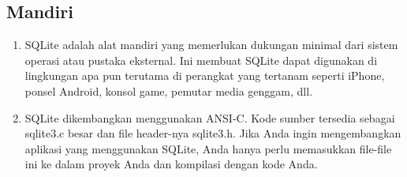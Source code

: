 \begin{enumerate}
		\subsection{Mandiri}
		\begin{enumerate}
		\item SQLite adalah alat mandiri yang memerlukan dukungan minimal dari sistem operasi atau pustaka eksternal. Ini membuat SQLite dapat digunakan di lingkungan apa pun terutama di perangkat yang tertanam seperti iPhone, ponsel Android, konsol game, pemutar media genggam, dll.
		\item SQLite dikembangkan menggunakan ANSI-C. Kode sumber tersedia sebagai sqlite3.c besar dan file header-nya sqlite3.h. Jika Anda ingin mengembangkan aplikasi yang menggunakan SQLite, Anda hanya perlu memasukkan file-file ini ke dalam proyek Anda dan kompilasi dengan kode Anda.
		\end{enumerate}
		

\end{enumerate}

